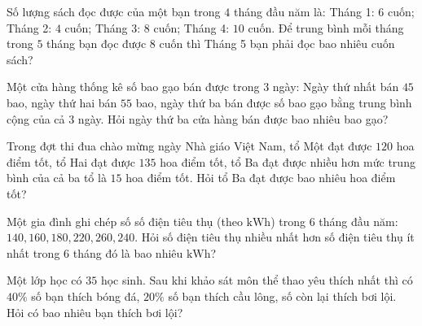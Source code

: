 \begin{ex} %
Số lượng sách đọc được của một bạn trong $4$ tháng đầu năm là: Tháng 1: $6$ cuốn; Tháng 2: $4$ cuốn; Tháng 3: $8$ cuốn; Tháng 4: $10$ cuốn. Để trung bình mỗi tháng trong $5$ tháng bạn đọc được $8$ cuốn thì Tháng 5 bạn phải đọc bao nhiêu cuốn sách?
\end{ex}

\begin{ex} %
Một cửa hàng thống kê số bao gạo bán được trong $3$ ngày: Ngày thứ nhất bán $45$ bao, ngày thứ hai bán $55$ bao, ngày thứ ba bán được số bao gạo bằng trung bình cộng của cả $3$ ngày. Hỏi ngày thứ ba cửa hàng bán được bao nhiêu bao gạo?
\end{ex}

\begin{ex} %
Trong đợt thi đua chào mừng ngày Nhà giáo Việt Nam, tổ Một đạt được $120$ hoa điểm tốt, tổ Hai đạt được $135$ hoa điểm tốt, tổ Ba đạt được nhiều hơn mức trung bình của cả ba tổ là $15$ hoa điểm tốt. Hỏi tổ Ba đạt được bao nhiêu hoa điểm tốt?
\end{ex}

\begin{ex} %
Một gia đình ghi chép số số điện tiêu thụ (theo $\text{kWh}$) trong $6$ tháng đầu năm: $140, 160, 180, 220, 260, 240$. Hỏi số điện tiêu thụ nhiều nhất hơn số điện tiêu thụ ít nhất trong $6$ tháng đó là bao nhiêu $\text{kWh}$?
\end{ex}

\begin{ex} %
Một lớp học có $35$ học sinh. Sau khi khảo sát môn thể thao yêu thích nhất thì có $40\%$ số bạn thích bóng đá, $20\%$ số bạn thích cầu lông, số còn lại thích bơi lội. Hỏi có bao nhiêu bạn thích bơi lội?
\end{ex}
